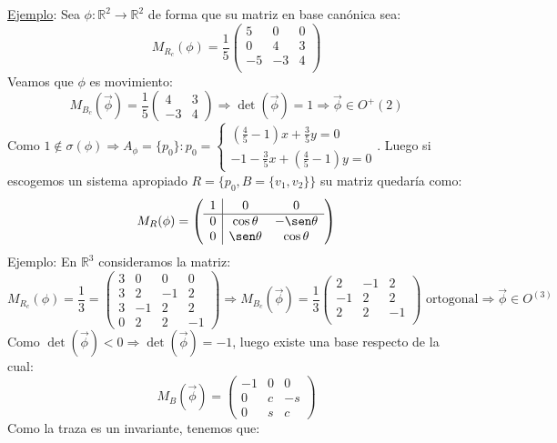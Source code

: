 \documentclass[10pt,a4paper,openright]{book}
\theoremstyle{break}
\begin{document}
\underline{Ejemplo}:
Sea $\phi: \mathbb{R}^2 \to \mathbb{R}^2$ de forma que su matriz en base canónica sea:
$$M_{R_c} (\phi) = \frac{1}{5} \begin{pmatrix} 5 & 0 & 0 \\ 0 & 4 & 3 \\ -5 & -3 & 4 \\\end{pmatrix} $$
Veamos que $\phi$ es movimiento:
$$M_{B_c} (\vec{\phi}) = \frac{1}{5} \begin{pmatrix}
4 & 3 \\ -3 & 4
\end{pmatrix} \Rightarrow \det(\vec{\phi}) = 1 \Rightarrow \vec{\phi} \in O^+ (2)$$
Como $1 \notin \sigma(\phi) \Rightarrow A_\phi = \{p_0\} : p_0 = \begin{cases} (\frac{4}{5} - 1) x + \frac{3}{5} y = 0 \\ -1 - \frac{3}{5} x + (\frac{4}{5} - 1) y = 0\end{cases}$. Luego si escogemos un sistema apropiado $R = \{p_0, B = \{v_1, v_2\}\}$ su matriz quedaría como:
$$M_R (\phi) = \left(\begin{array}{c|cc}
1& 0  & 0 \\
\hline
0 & \cos\theta & -\sen\theta    \\
0 & \sen\theta & \cos\theta 
\end{array}
\right)$$
Ejemplo: En $\mathbb{R}^3$ consideramos la matriz:
$$M_{R_c} (\phi) = \frac{1}{3} =
\left(\begin{array}{c|ccc}
3 & 0  & 0 & 0 \\
\hline
3 & 2 & -1 & 2    \\
3 & -1 & 2 & 2 \\
0 & 2 & 2 & -1 
\end{array}
\right) \Rightarrow M_{B_c} (\vec{\phi}) = \frac{1}{3} \begin{pmatrix} 2 & -1 & 2 \\ -1 & 2 & 2 \\ 2 & 2 & -1 \\\end{pmatrix} \mbox{ ortogonal}\Rightarrow \vec{\phi} \in O^(3)$$
Como $\det (\vec{\phi}) < 0 \Rightarrow \det(\vec{\phi}) = -1$, luego existe una base respecto de la cual:
$$M_B(\vec{\phi})=\begin{pmatrix} -1 & 0 & 0 \\ 0 & c & -s \\ 0 & s & c\end{pmatrix}$$
Como la traza es un invariante, tenemos que:
\end{document}
